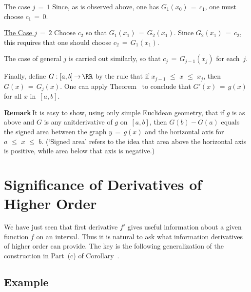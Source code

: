         \underline{The case $j \,=\, 1$} Since, as is observed above, one has $G_{1}(x_{0}) \,=\, c_{1}$, one must choose $c_{1} \,=\, 0$.

        \underline{The Case $j \,=\, 2$} Choose $c_{2}$ so that $G_{1}(x_{1}) \,=\, G_{2}(x_{1})$.
    Since $G_{2}(x_{1}) \,=\, c_{2}$, this requires that one should choose $c_{2} \,=\, G_{1}(x_{1})$.

        The case of general $j$ is carried out similarly, so that $c_{j} \,=\, G_{j-1}(x_{j})$ for each~$j$.

        Finally, define $G:[a,b] \,{\rightarrow}\, {\RR}$ by the rule that if $x_{j-1}\,\,{\leq}\,\,x\,\,{\leq}\,\,x_{j}$, then $G(x) \,=\, G_{j}(x)$.
    One can apply Theorem~ to conclude that $G'(x) \,=\, g(x)$ for all $x$ in~$[a,b]$. \Q

\V

        {\bf Remark}\,It is easy to show, using only simple Euclidean geometry, that if $g$ is as above and $G$ is any anitderivative of $g$ on~$[a,b]$,
    then $G(b) - G(a)$ equals the signed area between the graph $y \,=\, g(x)$ and the horizontal axis for $a\,\,{\leq}\,\,x\,\,{\leq}\,\,b$.
    (`Signed area' refers to the idea that area above the horizontal axis is positive, while area below that axis is negative.)

\VV



\VV

                \section{{\bf Significance of Derivatives of Higher Order}}
                \label{SectE42}

\VV

        We have just seen that first derivative $f'$ gives useful information about a given function $f$ on an interval.
    Thus it is natural to ask what information derivatives of higher order can provide.
    The key is the following generalization of the construction in Part~(c) of Corollary~.

\V

            \subsection{\small{\bf Example}}
            \label{ExampE40.68A}

